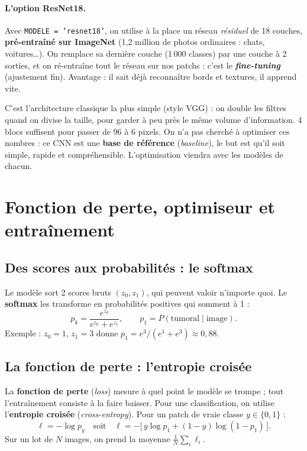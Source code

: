 \documentclass[11pt,a4paper]{article}
\begin{document}
\paragraph{L'option ResNet18.} Avec \texttt{MODELE = 'resnet18'}, on utilise à la place un réseau
\emph{résiduel} de 18 couches, \textbf{pré-entraîné sur ImageNet} (1,2 million de photos ordinaires :
chats, voitures…). On remplace sa dernière couche (1\,000 classes) par une couche à 2 sorties, et on
ré-entraîne tout le réseau sur nos patchs : c'est le \textbf{\emph{fine-tuning}} (ajustement fin).
Avantage : il sait déjà reconnaître bords et textures, il apprend vite.

\begin{oral}
C'est l'architecture classique la plus simple (style VGG) : on double les filtres quand on divise la taille,
pour garder à peu près le même volume d'information. 4 blocs suffisent pour passer de 96 à 6 pixels. On n'a
pas cherché à optimiser ces nombres : ce CNN est une \textbf{base de référence} (\emph{baseline}), le but est
qu'il soit simple, rapide et compréhensible. L'optimisation viendra avec les modèles de chacun.
\end{oral}

\section{Fonction de perte, optimiseur et entraînement}

\subsection{Des scores aux probabilités : le softmax}
Le modèle sort 2 scores bruts $(z_0, z_1)$, qui peuvent valoir n'importe quoi. Le \textbf{softmax} les
transforme en probabilités positives qui somment à 1 :
\[
p_k = \frac{e^{z_k}}{e^{z_0} + e^{z_1}}, \qquad p_1 = P(\text{tumoral} \mid \text{image}).
\]
Exemple : $z_0 = 1$, $z_1 = 3$ donne $p_1 = e^3/(e^1+e^3) \approx 0{,}88$.

\subsection{La fonction de perte : l'entropie croisée}
La \textbf{fonction de perte} (\emph{loss}) mesure à quel point le modèle se trompe ; tout l'entraînement
consiste à la faire baisser. Pour une classification, on utilise l'\textbf{entropie croisée}
(\emph{cross-entropy}). Pour un patch de vraie classe $y \in \{0, 1\}$ :
\[
\ell = -\log p_y \quad\text{soit}\quad \ell = -\big[\, y \log p_1 + (1-y)\log(1-p_1) \,\big].
\]
Sur un lot de $N$ images, on prend la moyenne $\frac{1}{N}\sum_i \ell_i$.
\end{document}
